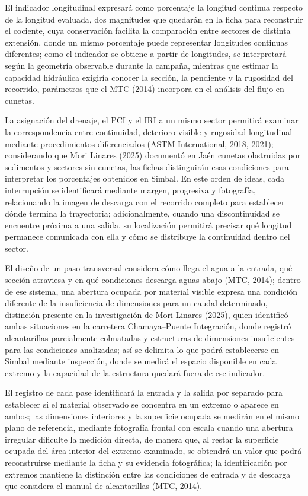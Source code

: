 El indicador longitudinal expresará como porcentaje la longitud continua respecto de la longitud evaluada, dos magnitudes que quedarán en la ficha para reconstruir el cociente, cuya conservación facilita la comparación entre sectores de distinta extensión, donde un mismo porcentaje puede representar longitudes continuas diferentes; como el indicador se obtiene a partir de longitudes, se interpretará según la geometría observable durante la campaña, mientras que estimar la capacidad hidráulica exigiría conocer la sección, la pendiente y la rugosidad del recorrido, parámetros que el MTC (2014) incorpora en el análisis del flujo en cunetas.

La asignación del drenaje, el PCI y el IRI a un mismo sector permitirá examinar la correspondencia entre continuidad, deterioro visible y rugosidad longitudinal mediante procedimientos diferenciados (ASTM International, 2018, 2021); considerando que Mori Linares (2025) documentó en Jaén cunetas obstruidas por sedimentos y sectores sin cunetas, las fichas distinguirán esas condiciones para interpretar los porcentajes obtenidos en Simbal. En este orden de ideas, cada interrupción se identificará mediante margen, progresiva y fotografía, relacionando la imagen de descarga con el recorrido completo para establecer dónde termina la trayectoria; adicionalmente, cuando una discontinuidad se encuentre próxima a una salida, su localización permitirá precisar qué longitud permanece comunicada con ella y cómo se distribuye la continuidad dentro del sector.


El diseño de un paso transversal considera cómo llega el agua a la entrada, qué sección atraviesa y en qué condiciones descarga aguas abajo (MTC, 2014); dentro de ese sistema, una abertura ocupada por material visible expresa una condición diferente de la insuficiencia de dimensiones para un caudal determinado, distinción presente en la investigación de Mori Linares (2025), quien identificó ambas situaciones en la carretera Chamaya–Puente Integración, donde registró alcantarillas parcialmente colmatadas y estructuras de dimensiones insuficientes para las condiciones analizadas; así se delimita lo que podrá establecerse en Simbal mediante inspección, donde se medirá el espacio disponible en cada extremo y la capacidad de la estructura quedará fuera de ese indicador.

El registro de cada pase identificará la entrada y la salida por separado para establecer si el material observado se concentra en un extremo o aparece en ambos; las dimensiones interiores y la superficie ocupada se medirán en el mismo plano de referencia, mediante fotografía frontal con escala cuando una abertura irregular dificulte la medición directa, de manera que, al restar la superficie ocupada del área interior del extremo examinado, se obtendrá un valor que podrá reconstruirse mediante la ficha y su evidencia fotográfica; la identificación por extremos mantiene la distinción entre las condiciones de entrada y de descarga que considera el manual de alcantarillas (MTC, 2014).

